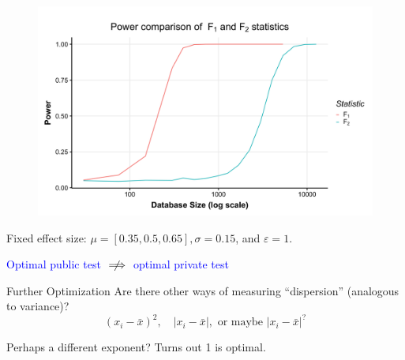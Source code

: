 \documentclass{beamer}
\begin{document}
\begin{frame}{}
  \begin{figure}
  \includegraphics[scale=0.12]{images/f1-vs-f2}
  \end{figure}
  \centering
 \small  Fixed effect size: $\mu = [0.35, 0.5, 0.65], \sigma = 0.15$, and $\varepsilon = 1$.
  
  \pause
  \centering
  \large \textcolor{blue}{Optimal public test $\centernot \implies $ optimal private test}

\end{frame}

\begin{frame}{Further Optimization}
\pause
Are there other ways of measuring ``dispersion'' (analogous to variance)? 
$$(x_i - \bar{x})^2, \quad \lvert x_i - \bar{x} \rvert, \text{ or maybe }\lvert x_i - \bar{x} \rvert^?$$  \pause

Perhaps a different exponent? \pause Turns out 1 is optimal.
\end{frame}
\end{document}
